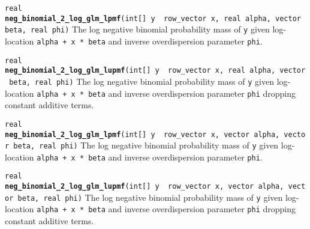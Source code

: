 \documentclass[
  10pt,
]{book}
\begin{document}

\texttt{real} \textbf{\texttt{neg\_binomial\_2\_log\_glm\_lpmf}}\texttt{(int{[}{]}\ y\ \textbar{}\ row\_vector\ x,\ real\ alpha,\ vector\ beta,\ real\ phi)}\newline
The log negative binomial probability mass of \texttt{y} given log-location
\texttt{alpha\ +\ x\ *\ beta} and inverse overdispersion parameter \texttt{phi}.


\texttt{real} \textbf{\texttt{neg\_binomial\_2\_log\_glm\_lupmf}}\texttt{(int{[}{]}\ y\ \textbar{}\ row\_vector\ x,\ real\ alpha,\ vector\ beta,\ real\ phi)}\newline
The log negative binomial probability mass of \texttt{y} given log-location
\texttt{alpha\ +\ x\ *\ beta} and inverse overdispersion parameter \texttt{phi}
dropping constant additive terms.


\texttt{real} \textbf{\texttt{neg\_binomial\_2\_log\_glm\_lpmf}}\texttt{(int{[}{]}\ y\ \textbar{}\ row\_vector\ x,\ vector\ alpha,\ vector\ beta,\ real\ phi)}\newline
The log negative binomial probability mass of \texttt{y} given log-location
\texttt{alpha\ +\ x\ *\ beta} and inverse overdispersion parameter \texttt{phi}.


\texttt{real} \textbf{\texttt{neg\_binomial\_2\_log\_glm\_lupmf}}\texttt{(int{[}{]}\ y\ \textbar{}\ row\_vector\ x,\ vector\ alpha,\ vector\ beta,\ real\ phi)}\newline
The log negative binomial probability mass of \texttt{y} given log-location
\texttt{alpha\ +\ x\ *\ beta} and inverse overdispersion parameter \texttt{phi}
dropping constant additive terms.

\end{document}
